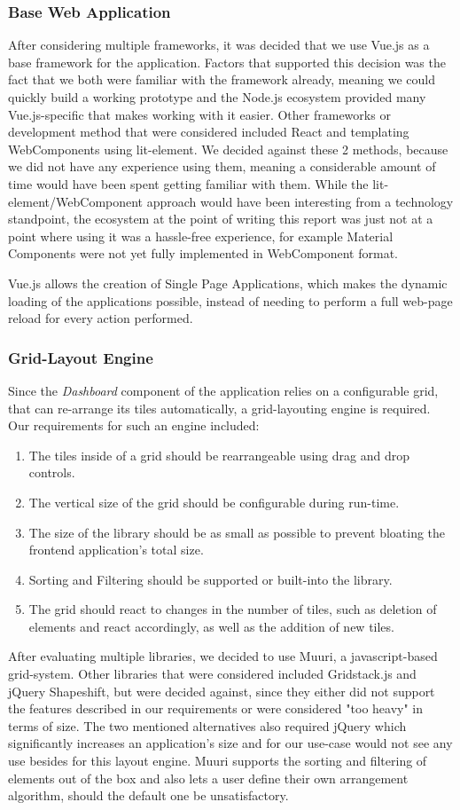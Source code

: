  \subsubsection{Base Web Application}
 After considering multiple frameworks, it was decided that we use Vue.js as a base framework for the application. Factors that supported this decision was the fact that we both were familiar with the framework already, meaning we could quickly build a working prototype and the Node.js ecosystem provided many Vue.js-specific that makes working with it easier. Other frameworks or development method that were considered included React and templating WebComponents using lit-element. We decided against these 2 methods, because we did not have any experience using them, meaning a considerable amount of time would have been spent getting familiar with them. While the lit-element/WebComponent approach would have been interesting from a technology standpoint, the ecosystem at the point of writing this report was just not at a point where using it was a hassle-free experience, for example Material Components were not yet fully implemented in WebComponent format.
 
 Vue.js allows the creation of Single Page Applications, which makes the dynamic loading of the applications possible, instead of needing to perform a full web-page reload for every action performed.
 \subsubsection{Grid-Layout Engine}
 Since the \emph{Dashboard} component of the application relies on a configurable grid, that can re-arrange its tiles automatically, a grid-layouting engine is required. Our requirements for such an engine included:
 \begin{enumerate}
    \item The tiles inside of a grid should be rearrangeable using drag and drop controls.
    \item The vertical size of the grid should be configurable during run-time.
    \item The size of the library should be as small as possible to prevent bloating the frontend application's total size.
    \item Sorting and Filtering should be supported or built-into the library.
    \item The grid should react to changes in the number of tiles, such as deletion of elements and react accordingly, as well as the addition of new tiles.
\end{enumerate}{}
After evaluating multiple libraries, we decided to use Muuri, a javascript-based grid-system. Other libraries that were considered included Gridstack.js and jQuery Shapeshift, but were decided against, since they either did not support the features described in our requirements or were considered "too heavy" in terms of size. The two mentioned alternatives also required jQuery which significantly increases an application's size and for our use-case would not see any use besides for this layout engine.
Muuri supports the sorting and filtering of elements out of the box and also lets a user define their own arrangement algorithm, should the default one be unsatisfactory. 
